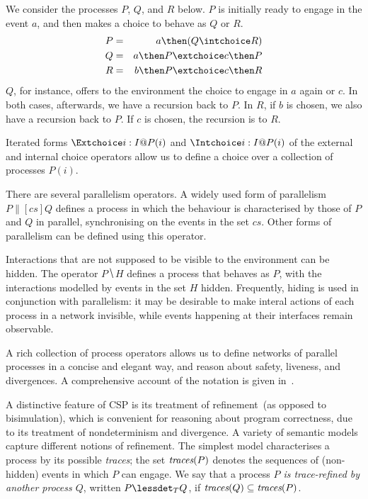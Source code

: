 \begin{example}\label{example:CSP}
  We consider the processes $P$, $Q$, and $R$ below. $P$ is initially
  ready to engage in the event $a$, and then makes a choice to
  behave as $Q$ or $R$.
  \begin{eqnarray*}
  P & = & a \then (Q\intchoice R)
  \\
  Q & = & a \then P \extchoice c \then P
  \\
  R & = & b \then P \extchoice c \then R
  \end{eqnarray*}
  $Q$, for instance, offers to the environment the choice to engage in $a$
  again or $c$. In both cases, afterwards, we have a recursion back to $P$.
  In $R$, if $b$ is chosen, we also have a recursion back to $P$. If $c$ is
  chosen, the recursion is to $R$.
  \xbox
\end{example}
%
Iterated forms $\Extchoice i: I @ P(i)$ and $\Intchoice i: I @ P(i)$ of the
external and internal choice operators allow us to define a choice over a
collection of processes $P(i)$.

There are several parallelism operators. A widely used form of parallelism $P
\parallel[cs] Q$ defines a process in which the behaviour is characterised by
those of $P$ and $Q$ in parallel, synchronising on the events in the set
$cs$. Other forms of parallelism can be defined using this operator.

Interactions that are not supposed to be visible to the environment can be
hidden. The operator $P \hide H$ defines a process that behaves as $P$, with the
interactions modelled by events in the set $H$ hidden. Frequently, hiding is used
in conjunction with parallelism: it may be desirable to make interal actions of each process in a network invisible, while events happening at their interfaces remain observable.


A rich collection of process operators allows us to define networks of
parallel processes in a concise and elegant way, and reason about safety,
liveness, and divergences.  A comprehensive account of the notation is given
in~\cite{Roscoe2010}.

A distinctive feature of CSP is its treatment of refinement~(as opposed to
bisimulation), which is convenient for reasoning about program correctness,
due to its treatment of nondeterminism and divergence.  A variety of semantic
models capture different notions of refinement. The simplest model
characterises a process by its possible \emph{traces}; the set $\text{\it traces}(P)$ denotes
 the sequences of (non-hidden) 
events in which
$P$ can engage.  We say that a process \emph{$P$ is trace-refined by another process
$Q$}, written $P \lessdet_T Q$, if $\text{\it traces}(Q)\subseteq \text{\it traces}(P)$. 

